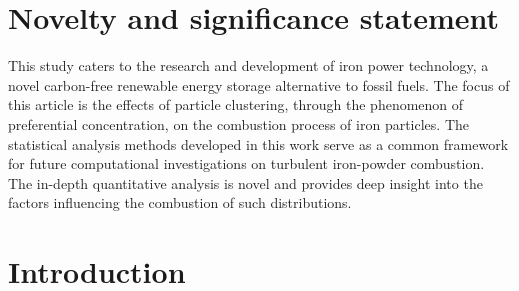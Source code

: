 \documentclass[times,twocolumn,final]{elsarticle}
\newcommand{\mrm}[1]{\mathrm{#1}}
\newcommand{\green}{\color{ForestGreen}}
\newcommand{\green}{}
\begin{document}
\linenumbers

\section*{Novelty and significance statement}
{\green This study caters to the research and development of iron power technology, a novel carbon-free renewable energy storage alternative to fossil fuels. The focus of this article is the effects of particle clustering, through the phenomenon of preferential concentration, on the combustion process of iron particles. The statistical analysis methods developed in this work serve as a common framework for future computational investigations on turbulent iron-powder combustion. The in-depth quantitative analysis is novel and provides deep insight into the factors influencing the combustion of such distributions.}


\section{Introduction}
\label{sec1}

\end{document}
